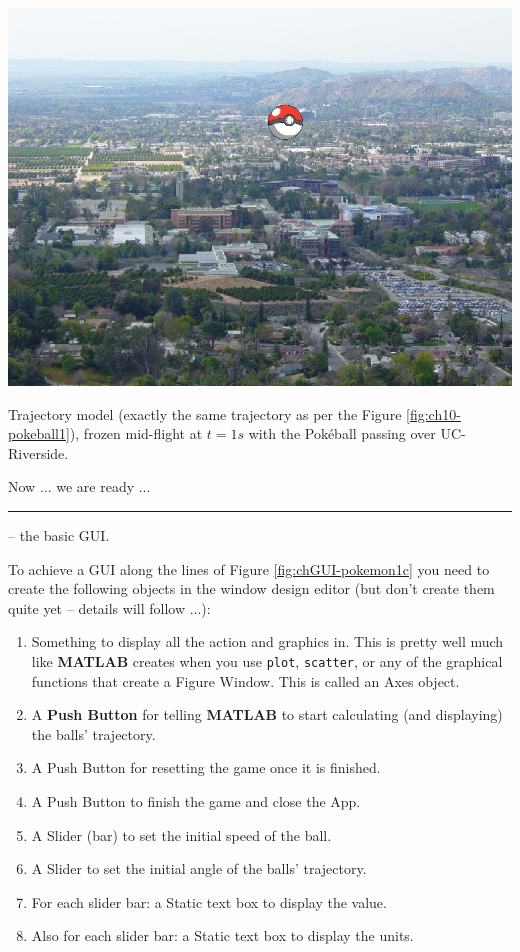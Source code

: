\documentclass{tufte-book} %
\begin{document}
\begin{marginfigure}[0.0in]
\includegraphics[width=\linewidth]{ch10-pokeball2.png}
\caption{Trajectory model (exactly the same trajectory as per the Figure \ref{fig:ch10-pokeball1}), frozen mid-flight at \(t=1s\) with the Pok\'eball passing over UC-Riverside.}
\label{fig:ch10-pokeball2}
\end{marginfigure}

Now ... we are ready ...

\vspace{1mm}
\noindent\rule{4cm}{0.5pt}
\vspace{-2mm}

 -- the basic GUI.

To achieve a GUI along the lines of Figure \ref{fig:chGUI-pokemon1c} you need to create the following objects in the window design editor (but don't create them quite yet -- details will follow ...):

\begin{enumerate}[noitemsep]
\setlength{\itemindent}{.2in}
\item Something to display all the action and graphics in. This is pretty well much like \textbf{MATLAB} creates when you use \texttt{plot}, \texttt{scatter}, or any of the graphical functions that create a \textsf{Figure Window}. This is called an \textsf{Axes} object. 
\item A \textbf{Push Button} for telling \textbf{MATLAB} to start calculating (and displaying) the balls' trajectory.
\item A \textsf{Push Button} for resetting the game once it is finished.
\item A \textsf{Push Button} to finish the game and close the App.
\item A \textsf{Slider} (bar) to set the initial speed of the ball.
\item A \textsf{Slider} to set the initial angle of the balls' trajectory.
\item For each slider bar: a \textsf{Static text box} to display the value.
\item Also for each slider bar: a \textsf{Static text box} to display the units.
\end{enumerate}
\end{document}
